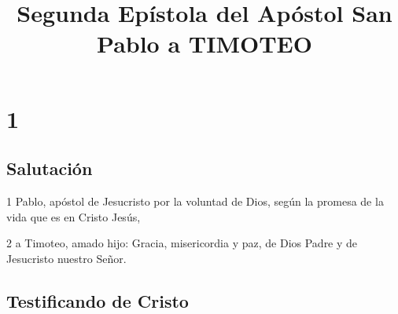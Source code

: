 
\title{Segunda Epístola del Apóstol San Pablo a TIMOTEO}

\chapter{1}

\section*{Salutación}

\par 1 Pablo, apóstol de Jesucristo por la voluntad de Dios, según la promesa de la vida que es en Cristo Jesús,
\par 2 a Timoteo, amado hijo: Gracia, misericordia y paz, de Dios Padre y de Jesucristo nuestro Señor.

\section*{Testificando de Cristo}

